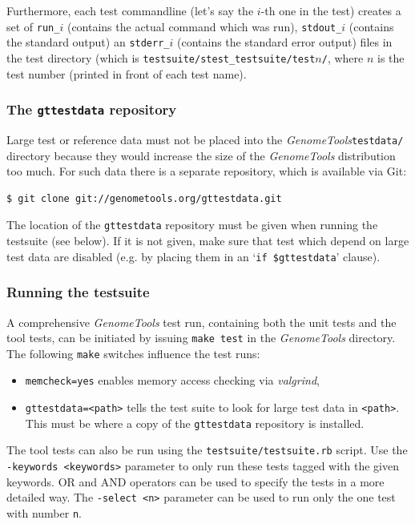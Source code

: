 \documentclass[11pt,final]{article}
\newcommand{\keyword}[1]{\lstinline{#1}}
\newcommand{\Gt}[0]{\emph{GenomeTools}\xspace}
\begin{document}
Furthermore, each test commandline (let's say the $i$-th one in the test)
creates a set of \keyword{run_}$i$ (contains the actual command which was run),
\keyword{stdout_}$i$ (contains the standard output) an \keyword{stderr_}$i$
(contains the standard error output) files in the test directory (which is
\keyword{testsuite/stest_testsuite/test}$n$\keyword{/}, where $n$ is the test
number (printed in front of each test name).

\subsubsection{The \keyword{gttestdata} repository}
\label{gttestdata}

Large test or reference data must not be placed into the \Gt \keyword{testdata/}
directory because they would increase the size of the \Gt distribution too much.
For such data there is a separate repository, which is available via Git:

\begin{lstlisting}[language=sh]
$ git clone git://genometools.org/gttestdata.git
\end{lstlisting}%

The location of the \keyword{gttestdata} repository must be given when running
the testsuite (see below). If it is not given, make sure that test which depend
on large test data are disabled (e.g. by placing them in an
`\keyword{if $gttestdata}' clause).%

\subsubsection{Running the testsuite}
A comprehensive \Gt test run, containing both the unit tests and the tool tests,
can be initiated by issuing \keyword{make test} in the \Gt directory.
The following \keyword{make} switches influence the test runs:
\begin{itemize}
\item
\keyword{memcheck=yes} enables memory access checking via \emph{valgrind},
\item 
\keyword{gttestdata=<path>} tells the test suite to look for large test data in
\keyword{<path>}. This must be where a copy of the \keyword{gttestdata}
repository is installed.
\end{itemize}

The tool tests can also be run using the \keyword{testsuite/testsuite.rb}
script. Use the \keyword{-keywords <keywords>} parameter to only run these
tests tagged with the given keywords. OR and AND operators can be used to
specify the tests in a more detailed way. The \keyword{-select <n>} parameter
can be used to run only the one test with number \keyword{n}.
\end{document}
